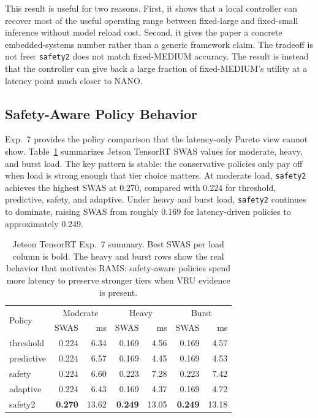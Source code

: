 \documentclass[10pt,journal]{IEEEtran}
\newcommand{\rams}{RAMS}
\newcommand{\swas}{SWAS}
\begin{document}
This result is useful for two reasons. First, it shows that a local controller can recover most of the useful operating range between fixed-large and fixed-small inference without model reload cost. Second, it gives the paper a concrete embedded-systems number rather than a generic framework claim. The tradeoff is not free: \texttt{safety2} does not match fixed-MEDIUM accuracy. The result is instead that the controller can give back a large fraction of fixed-MEDIUM's utility at a latency point much closer to NANO.

\subsection{Safety-Aware Policy Behavior}
Exp.~7 provides the policy comparison that the latency-only Pareto view cannot show. Table~\ref{tab:exp7} summarizes Jetson TensorRT \swas{} values for moderate, heavy, and burst load. The key pattern is stable: the conservative policies only pay off when load is strong enough that tier choice matters. At moderate load, \texttt{safety2} achieves the highest \swas{} at 0.270, compared with 0.224 for threshold, predictive, safety, and adaptive. Under heavy and burst load, \texttt{safety2} continues to dominate, raising \swas{} from roughly 0.169 for latency-driven policies to approximately 0.249.

\begin{table}[t]
\centering
\footnotesize
\setlength{\tabcolsep}{3.0pt}
\caption{Jetson TensorRT Exp.~7 summary. Best \swas{} per load column is bold. The heavy and burst rows show the real behavior that motivates \rams{}: safety-aware policies spend more latency to preserve stronger tiers when VRU evidence is present.}
\label{tab:exp7}
\begin{tabular}{lrr|rr|rr}
\toprule
\multirow{2}{*}{Policy} & \multicolumn{2}{c|}{Moderate} & \multicolumn{2}{c|}{Heavy} & \multicolumn{2}{c}{Burst} \\
& \swas{} & ms & \swas{} & ms & \swas{} & ms \\
\midrule
threshold & 0.224 & 6.34 & 0.169 & 4.56 & 0.169 & 4.57 \\
predictive & 0.224 & 6.57 & 0.169 & 4.45 & 0.169 & 4.53 \\
safety & 0.224 & 6.60 & 0.223 & 7.28 & 0.223 & 7.42 \\
adaptive & 0.224 & 6.43 & 0.169 & 4.37 & 0.169 & 4.72 \\
safety2 & \textbf{0.270} & 13.62 & \textbf{0.249} & 13.05 & \textbf{0.249} & 13.18 \\
\bottomrule
\end{tabular}
\end{table}
\end{document}
